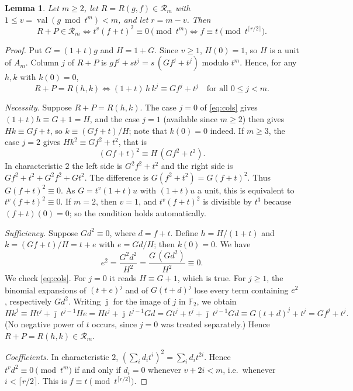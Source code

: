 \documentclass[11pt,a4paper]{amsart}
\newtheorem{lemma}[theorem]{Lemma}
\theoremstyle{definition}
\theoremstyle{remark}
\newcommand{\F}{\mathbb{F}_2}
\newcommand{\Rm}{\mathcal{R}_m}
\newcommand{\val}{\operatorname{val}}
\begin{document}
\begin{lemma}\label{lem:char}
Let $m\ge 2$, let $R=R(g,f)\in\Rm$ with $1\le v=\val(g\bmod t^m)<m$, and let $r=m-v$. Then
\[
  R+P\in\Rm \iff t^{v}(f+t)^2\equiv 0 \pmod{t^m}
  \iff f\equiv t \pmod{t^{\lceil r/2\rceil}} .
\]
\end{lemma}

\begin{proof}
Put $G=(1+t)g$ and $H=1+G$. Since $v\ge1$, $H(0)=1$, so $H$ is a unit of $A_m$. Column $j$ of $R+P$ is $gf^j+st^j=s\,(Gf^j+t^j)$ modulo $t^m$. Hence, for any $h,k$ with $k(0)=0$,
\begin{equation}\label{eq:cols}
  R+P=R(h,k) \iff (1+t)\,h\,k^j\equiv Gf^j+t^j \quad\text{for all } 0\le j<m. \tag{$\ast$}
\end{equation}

\emph{Necessity.} Suppose $R+P=R(h,k)$. The case $j=0$ of \eqref{eq:cols} gives $(1+t)h\equiv G+1=H$, and the case $j=1$ (available since $m\ge2$) then gives $Hk\equiv Gf+t$, so $k\equiv (Gf+t)/H$; note that $k(0)=0$ indeed. If $m\ge3$, the case $j=2$ gives $Hk^2\equiv Gf^2+t^2$, that is
\[
  (Gf+t)^2 \equiv H\,(Gf^2+t^2).
\]
In characteristic $2$ the left side is $G^2f^2+t^2$ and the right side is $Gf^2+t^2+G^2f^2+Gt^2$. The difference is $G(f^2+t^2)=G(f+t)^2$. Thus $G(f+t)^2\equiv0$. As $G=t^v(1+t)u$ with $(1+t)u$ a unit, this is equivalent to $t^v(f+t)^2\equiv0$. If $m=2$, then $v=1$, and $t^v(f+t)^2$ is divisible by $t^3$ because $(f+t)(0)=0$; so the condition holds automatically.

\emph{Sufficiency.} Suppose $Gd^2\equiv 0$, where $d=f+t$. Define $h=H/(1+t)$ and $k=(Gf+t)/H=t+e$ with $e=Gd/H$; then $k(0)=0$. We have
\[
  e^2=\frac{G^2d^2}{H^2}=\frac{G\,(Gd^2)}{H^2}\equiv 0 .
\]
We check \eqref{eq:cols}. For $j=0$ it reads $H\equiv G+1$, which is true. For $j\ge1$, the binomial expansions of $(t+e)^j$ and of $G(t+d)^j$ lose every term containing $e^2$, respectively $Gd^2$. Writing $\bar{\jmath}$ for the image of $j$ in $\F$, we obtain
\[
  Hk^j \equiv H t^j + \bar{\jmath}\,t^{j-1}He = Ht^j + \bar{\jmath}\, t^{j-1}Gd
  = Gt^j+t^j+\bar{\jmath}\,t^{j-1}Gd \equiv G(t+d)^j + t^j = Gf^j+t^j .
\]
(No negative power of $t$ occurs, since $j=0$ was treated separately.) Hence $R+P=R(h,k)\in\Rm$.

\emph{Coefficients.} In characteristic $2$, $(\sum_i d_it^i)^2=\sum_i d_it^{2i}$. Hence $t^vd^2\equiv0\pmod{t^m}$ if and only if $d_i=0$ whenever $v+2i<m$, i.e.\ whenever $i<\lceil r/2\rceil$. This is $f\equiv t\pmod{t^{\lceil r/2\rceil}}$.
\end{proof}
\end{document}

